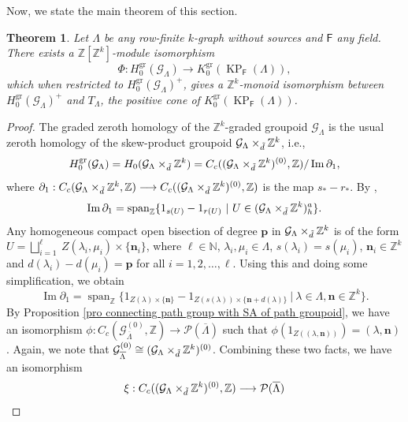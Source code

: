 \documentclass[12pt]{amsart}
\newcommand{\N}{\mathbf{n}}
\newcommand{\KP}{\operatorname{KP}}
\newtheorem{thm}{Theorem}[section]
\theoremstyle{definition}
\theoremstyle{remark}
\newcommand{\image}{\operatorname{Im}}
\newcommand{\lspan}{\operatorname{span}}
\newcommand{\gr}{\operatorname{gr}}
\begin{document}
Now, we state the main theorem of this section.
\begin{thm}\label{th relationship of graded K-theory and graded homology}
Let $\Lambda$ be any row-finite $k$-graph without sources and $\mathsf{F}$ any field. There exists a $\mathbb{Z}[\mathbb{Z}^k]$-module isomorphism \[\Phi:H_0^{\gr}(\mathcal{G}_\Lambda)\longrightarrow K_0^{\gr}(\KP_\mathsf{F}(\Lambda)),\] which when restricted to $H_0^{\gr}(\mathcal{G}_\Lambda)^+$, gives a $\mathbb{Z}^k$-monoid isomorphism between $H_0^{\gr}(\mathcal{G}_\Lambda)^+$ and $T_\Lambda$, the positive cone of $K_0^{\gr}(\KP_\mathsf{F}(\Lambda))$.     
\end{thm}
\begin{proof}
The graded zeroth homology of the $\mathbb{Z}^k$-graded groupoid $\mathcal{G}_\Lambda$ is the usual zeroth homology of the skew-product groupoid $\mathcal{G}_\Lambda\times_{\Tilde{d}} \mathbb{Z}^k$, i.e., \[H_0^{\gr}(\mathcal{G}_\Lambda)=H_0(\mathcal{G}_\Lambda\times_{\Tilde{d}} \mathbb{Z}^k)=C_c((\mathcal{G}_\Lambda\times_{\Tilde{d}}\mathbb{Z}^k)^{(0)},\mathbb{Z})/\image \partial_1,\] where $\partial_1:C_c(\mathcal{G}_\Lambda\times_{\Tilde{d}}\mathbb{Z}^k,\mathbb{Z})\longrightarrow C_c((\mathcal{G}_\Lambda\times_{\Tilde{d}}\mathbb{Z}^k)^{(0)},\mathbb{Z})$ is the map $s_*-r_*$. By \cite[Lemma 5.5]{H-Li}, \[\image \partial_1=\lspan_{\mathbb{Z}} \{1_{s(U)}-1_{r(U)}~|~U\in (\mathcal{G}_\Lambda \times_{\Tilde{d}}\mathbb{Z}^k)_h ^a\}.\] Any homogeneous compact open bisection of degree $\mathbf{p}$ in $\mathcal{G}_\Lambda\times_{\Tilde{d}}\mathbb{Z}^k$ is of the form $U=\displaystyle{\bigsqcup_{i=1}^{\ell}}~Z(\lambda_i,\mu_i)\times \{\N_i\}$, where $\ell\in \mathbb{N}$, $\lambda_i,\mu_i\in \Lambda$, $s(\lambda_i)=s(\mu_i)$, $\N_i\in \mathbb{Z}^k$ and $d(\lambda_i)-d(\mu_i)=\mathbf{p}$ for all $i=1,2,\ldots,\ell$. Using this and doing some simplification, we obtain \[\image \partial_1=\lspan_{\mathbb{Z}} \{1_{Z(\lambda)\times \{\N\}}-1_{Z(s(\lambda))\times \{\N+d(\lambda)\}}~|~\lambda\in \Lambda,\N\in \mathbb{Z}^k\}.\] By Proposition \ref{pro connecting path group with SA of path groupoid}, we have an isomorphism $\phi: C_c(\mathcal{G}_{\overline{\Lambda}}^{(0)},\mathbb{Z})\longrightarrow \mathcal{P}(\overline{\Lambda})$ such that $\phi(1_{Z((\lambda,\N))})=(\lambda,\N)$. Again, we note that $\mathcal{G}_{\overline{\Lambda}}^{(0)}\cong (\mathcal{G}_\Lambda\times_{\Tilde{d}}\mathbb{Z}^k)^{(0)}$. Combining these two facts, we have an isomorphism 
\begin{align*}
\xi:C_c((\mathcal{G}_\Lambda\times_{\Tilde{d}}\mathbb{Z}^k)^{(0)},\mathbb{Z})&\longrightarrow \mathcal{P}(\overline{\Lambda})\\

\end{align*}
\end{proof}
\end{document}
